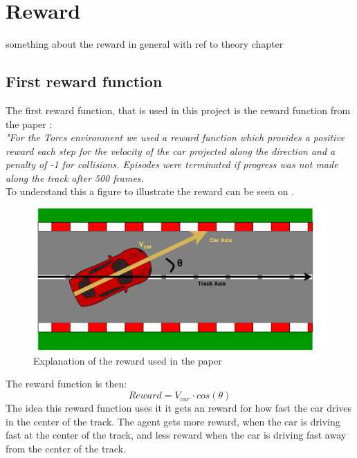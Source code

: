 \section{Reward}\label{sectionReward}
something about the reward in general with ref to theory chapter

\subsection*{First reward function}
The first reward function, that is used in this project is the reward function from the paper \cite{DBLP:journals/corr/LillicrapHPHETS15}: \\
\textit{"For the Torcs environment we used a reward function which provides a positive reward each step for the velocity of the car projected along the direction and a penalty of -1 for collisions. Episodes were terminated if progress was not made along the track after 500 frames.}\\
To understand this a figure to illustrate the reward can be seen on .

\begin{figure}[H]
	\centering
	\includegraphics[width=1\textwidth]{Figures/Result/Reward_paper.pdf}
	\caption{Explanation of the reward used in the paper \cite{DBLP:journals/corr/LillicrapHPHETS15} }
	\label{fig:Reward_paper}
\end{figure}

The reward function is then:
\begin{equation}
Reward = V_{car} \cdot cos(\theta) 
\end{equation}
The idea this reward function uses it it gets an reward for how fast the car drives in the center of the track. The agent gets more reward, when the car is driving fast at the center of the track, and less reward when the car is driving fast away from the center of the track. 

